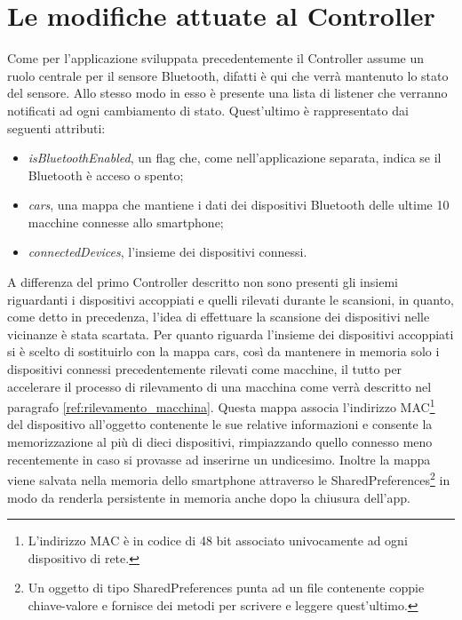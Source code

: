 \section{Le modifiche attuate al Controller}
Come per l'applicazione sviluppata precedentemente il Controller assume un ruolo centrale per il sensore Bluetooth, difatti è qui che verrà mantenuto lo stato del sensore. Allo stesso modo in esso è presente una lista di listener che verranno notificati ad ogni cambiamento di stato. Quest'ultimo è rappresentato dai seguenti attributi:
\begin{itemize}
    \item \textit{isBluetoothEnabled}, un flag che, come nell'applicazione separata, indica se il Bluetooth è acceso o spento;
    \item \textit{cars}, una mappa che mantiene i dati dei dispositivi Bluetooth delle ultime 10 macchine connesse allo smartphone;
    \item \textit{connectedDevices}, l'insieme dei dispositivi connessi.
\end{itemize}
A differenza del primo Controller descritto non sono presenti gli insiemi riguardanti i dispositivi accoppiati e quelli rilevati durante le scansioni, in quanto, come detto in precedenza, l'idea di effettuare la scansione dei dispositivi nelle vicinanze è stata scartata. Per quanto riguarda l'insieme dei dispositivi accoppiati si è scelto di sostituirlo con la mappa cars, così da mantenere in memoria solo i dispositivi connessi precedentemente rilevati come macchine, il tutto per accelerare il processo di rilevamento di una macchina come verrà descritto nel paragrafo \ref{ref:rilevamento_macchina}. Questa mappa associa l'indirizzo MAC\footnote{L'indirizzo MAC è in codice di 48 bit associato univocamente ad ogni dispositivo di rete.} del dispositivo all'oggetto contenente le sue relative informazioni e consente la memorizzazione al più di dieci dispositivi, rimpiazzando quello connesso meno recentemente in caso si provasse ad inserirne un undicesimo. Inoltre la mappa viene salvata nella memoria dello smartphone attraverso le SharedPreferences\footnote{Un oggetto di tipo SharedPreferences punta ad un file contenente coppie chiave-valore e fornisce dei metodi per scrivere e leggere quest'ultimo.} in modo da renderla persistente in memoria anche dopo la chiusura dell'app.

